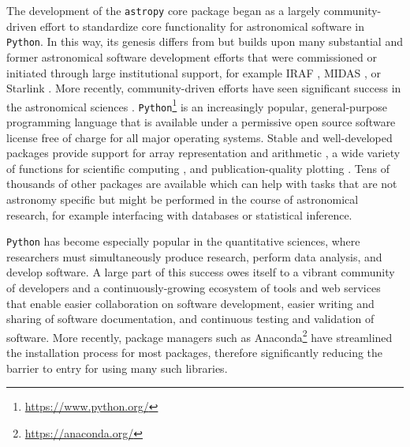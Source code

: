 \documentclass[modern]{aastex61}
\newcommand{\package}[1]{\texttt{#1}\xspace}
\newcommand{\python}{\package{Python}}
\newcommand{\astropypkg}{\package{astropy}}
\newcommand{\inlinecomment}[2]{\todo[inline]{#1: #2}\xspace}
\begin{document}

The development of the \astropypkg core package began as a largely
community-driven effort to standardize core functionality for astronomical
software in \python.
In this way, its genesis differs from but builds upon many substantial and
%
%
%
former astronomical software development efforts that were commissioned or
initiated through large institutional support, for example IRAF \citep[developed
at NOAO;][]{IRAF}, MIDAS \citep[developed at ESO;][]{MIDAS}, or Starlink
\citep[originally developed by a consortium of UK institutions and now
maintained by the East Asian Observatory;][]{starlink1982,starlink2013}.
More recently, community-driven efforts have seen significant success in the astronomical sciences \citep{yt}.
\python\footnote{\url{https://www.python.org/}} is an increasingly popular,
general-purpose programming language that is available under a permissive open
source software license free of charge for all major operating systems.
Stable and well-developed packages provide support for array representation and arithmetic
\citep[\package{numpy};][]{numpy}, a wide variety of functions for scientific
computing \citep[\package{scipy};][]{numpy}, and publication-quality plotting
\citep[\package{matplotlib};][]{matplotlib}. Tens of thousands of other packages
are available which can help with tasks that are not astronomy specific but
might be performed in the course of astronomical research, for example interfacing with databases or statistical inference.

\python has become especially popular in the quantitative sciences,
where researchers must simultaneously produce research, perform data analysis,
and develop software.
A large part of this success owes itself to a vibrant community of developers
and a continuously-growing ecosystem of tools and web services that enable
easier collaboration on software development, easier writing and sharing of
software documentation, and continuous testing and validation of software.
More recently, package managers such as
Anaconda\footnote{\url{https://anaconda.org/}} have streamlined the installation
process for most packages, therefore significantly reducing the barrier to entry
for using many such libraries.
\end{document}
